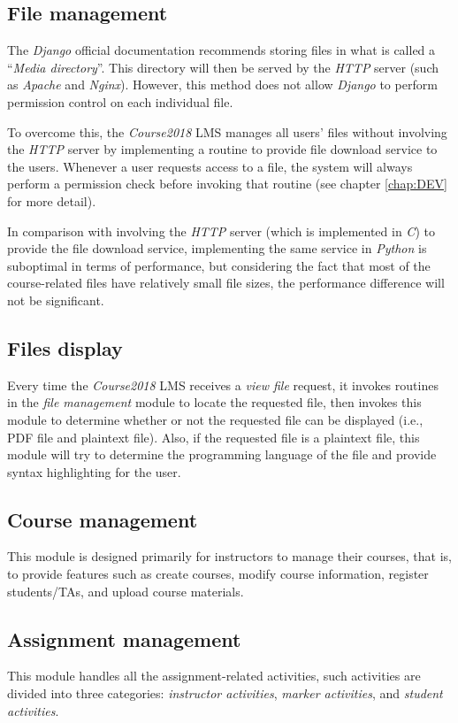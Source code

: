 \subsection{File management}
The \emph{Django} official documentation recommends storing files in what is
called a ``\emph{Media directory}''. This directory will then be served by the
\emph{HTTP} server \cite{djangoManagingFiles}
(such as \emph{Apache} and \emph{Nginx}). However, this method does not allow
\emph{Django} to perform permission control on each individual file.

\medskip

To overcome this, the \emph{Course2018} LMS manages all users' files without
involving the \emph{HTTP} server by implementing a routine to provide file
download service to the users. Whenever a user requests access to a file, the system
will always perform a permission check before invoking that routine
(see chapter \ref{chap:DEV} for more detail).

\medskip

In comparison with
involving the \emph{HTTP} server (which is implemented in \emph{C}) to provide
the file download service,
implementing the same service in \emph{Python} is suboptimal in terms of
performance, 
but considering the fact that most of the course-related
files have relatively small file sizes, the performance difference will
not be significant.

\subsection{Files display}
Every time the \emph{Course2018} LMS receives a \emph{view file} request,
it invokes routines in the \emph{file management} module to locate the
requested file, then invokes this module to determine whether or not the
requested file can be displayed (i.e., PDF file and plaintext file). Also,
if the requested file is a plaintext file, this module will try to determine
the programming language of the file and provide syntax highlighting for the
user.

\subsection{Course management}
This module is designed primarily for instructors to manage their courses, 
that is, to provide features such as create courses, modify course information,
register students/TAs, and upload course materials.

\subsection{Assignment management}
\label{sec:ASNMAN}
This module handles all the assignment-related activities, such activities are
divided into three categories: \emph{instructor activities}, 
\emph{marker activities}, and \emph{student activities}.

